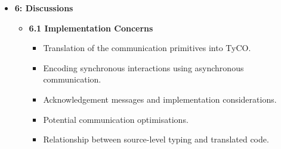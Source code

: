 \begin{itemize}
\begin{itemize}
        \item \textbf{5.2 Typing System}
        \begin{itemize}
            \item Typing judgments and typing environments.
            \item Inference rules for session initiation and acceptance.
            \item Rules for sending, receiving, selection, and branching.
            \item Typing rules for delegation and parallel composition.
            \item Typing rules for conditionals, restriction, and recursion.
            \item Syntax-directed type inference and principal types.
            \item Linear usage of channels and prevention of interaction errors.
            \item Subject reduction and absence of communication errors.
        \end{itemize}

        \item \textbf{5.3 Examples}
        \begin{itemize}
            \item Typing of the factorial example.
            \item Dual types for a cell supporting read and write operations.
            \item Type representation of the recursive ATM protocol.
            \item Type abstraction of the FTP server protocol.
            \item Illustration of how recursion and branching appear in types.
        \end{itemize}
    \end{itemize}

    \item \textbf{6: Discussions}
    \begin{itemize}
        \item \textbf{6.1 Implementation Concerns}
        \begin{itemize}
            \item Translation of the communication primitives into TyCO.
            \item Encoding synchronous interactions using asynchronous communication.
            \item Acknowledgement messages and implementation considerations.
            \item Potential communication optimisations.
            \item Relationship between source-level typing and translated code.
        \end{itemize}


\end{itemize}
\end{itemize}
